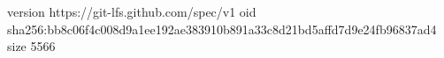 version https://git-lfs.github.com/spec/v1
oid sha256:bb8c06f4c008d9a1ee192ae383910b891a33c8d21bd5affd7d9e24fb96837ad4
size 5566
